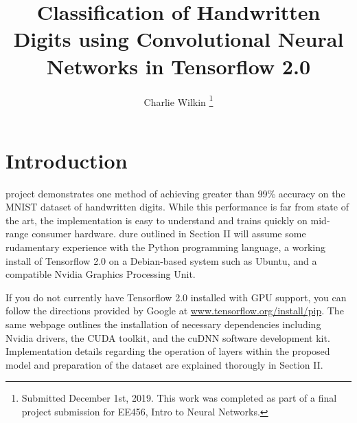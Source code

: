 \documentclass[transmag]{IEEEtran}
\begin{document}
\title{Classification of Handwritten Digits using Convolutional Neural Networks
in Tensorflow 2.0}

\author{Charlie Wilkin
\thanks{Submitted December 1st, 2019. This work was completed as part of a 
final project submission for EE456, Intro to Neural Networks.}}


\maketitle

\section{Introduction}

 project demonstrates one method of achieving greater than
99\% accuracy on the MNIST dataset of handwritten digits. While this
performance is far from state of the art, the implementation is easy to
understand and trains quickly on mid-range consumer hardware.  
dure outlined in Section II will assume some rudamentary experience with the
Python programming language, a working install of Tensorflow 2.0 on
a Debian-based system such as Ubuntu, and a compatible Nvidia Graphics
Processing Unit. 

If you do not currently have Tensorflow 2.0 installed with GPU support, you
can follow the directions provided by Google at 
\href{https://www.tensorflow.org/install/gpu}{www.tensorflow.org/install/pip}.
The same webpage outlines the installation of necessary dependencies including
Nvidia drivers, the CUDA toolkit, and the cuDNN software development kit. 
Implementation details regarding the operation of layers within the proposed
model and preparation of the dataset are explained thorougly in Section II.
\end{document}
